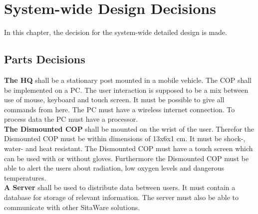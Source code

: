 \chapter{System-wide Design Decisions}

In this chapter, the decision for the system-wide detailed design is made.
\section{Parts Decisions}
\textbf{The HQ} shall be a stationary post mounted in a mobile vehicle. The COP shall be implemented on a PC. The user interaction is supposed to be a mix between use of mouse, keyboard and touch screen. It must be possible to give all commands from here. The PC must have a wireless internet connection. To process data the PC must have a processor.\\

\textbf{The Dismounted COP} shall be mounted on the wrist of the user. Therefor the Dismounted COP must be within dimensions of 13x6x1 cm. It must be shock-, water- and heat resistant. The Dismounted COP must have a touch screen which can be used with or without gloves. Furthermore the Dismounted COP must be able to alert the users about radiation, low oxygen levels and dangerous temperatures.\\

\textbf{A Server} shall be used to distribute data between users. It must contain a database for storage of relevant information. The server must also be able to communicate with other SitaWare solutions.\\

